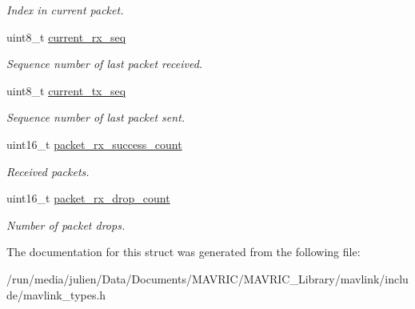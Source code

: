 \begin{DoxyCompactItemize}
\begin{DoxyCompactList}\small\item\em Index in current packet. \end{DoxyCompactList}\item 
\hypertarget{struct____mavlink__status_affbdd32b3dff8ae35327a79ed6b17646}{uint8\+\_\+t \hyperlink{struct____mavlink__status_affbdd32b3dff8ae35327a79ed6b17646}{current\+\_\+rx\+\_\+seq}}\label{struct____mavlink__status_affbdd32b3dff8ae35327a79ed6b17646}

\begin{DoxyCompactList}\small\item\em Sequence number of last packet received. \end{DoxyCompactList}\item 
\hypertarget{struct____mavlink__status_a06482d6c3fbfa829526c9b2e2e895f32}{uint8\+\_\+t \hyperlink{struct____mavlink__status_a06482d6c3fbfa829526c9b2e2e895f32}{current\+\_\+tx\+\_\+seq}}\label{struct____mavlink__status_a06482d6c3fbfa829526c9b2e2e895f32}

\begin{DoxyCompactList}\small\item\em Sequence number of last packet sent. \end{DoxyCompactList}\item 
\hypertarget{struct____mavlink__status_aa088f67773cdf9ff541c5880e65cee68}{uint16\+\_\+t \hyperlink{struct____mavlink__status_aa088f67773cdf9ff541c5880e65cee68}{packet\+\_\+rx\+\_\+success\+\_\+count}}\label{struct____mavlink__status_aa088f67773cdf9ff541c5880e65cee68}

\begin{DoxyCompactList}\small\item\em Received packets. \end{DoxyCompactList}\item 
\hypertarget{struct____mavlink__status_a1a1f510b9484e705c971f20fd1d61912}{uint16\+\_\+t \hyperlink{struct____mavlink__status_a1a1f510b9484e705c971f20fd1d61912}{packet\+\_\+rx\+\_\+drop\+\_\+count}}\label{struct____mavlink__status_a1a1f510b9484e705c971f20fd1d61912}

\begin{DoxyCompactList}\small\item\em Number of packet drops. \end{DoxyCompactList}\end{DoxyCompactItemize}


The documentation for this struct was generated from the following file\+:\begin{DoxyCompactItemize}
\item 
/run/media/julien/\+Data/\+Documents/\+M\+A\+V\+R\+I\+C/\+M\+A\+V\+R\+I\+C\+\_\+\+Library/mavlink/include/mavlink\+\_\+types.\+h\end{DoxyCompactItemize}
